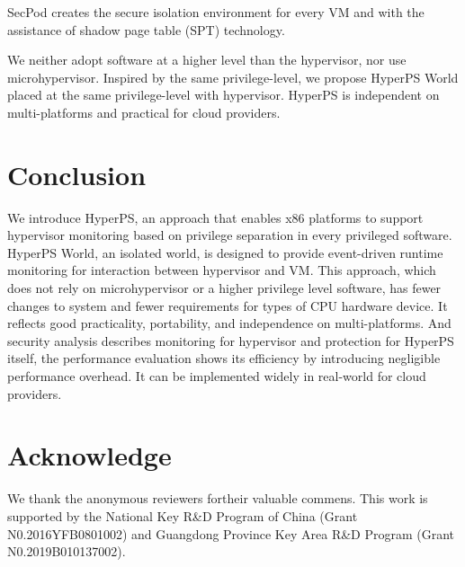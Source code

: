 \documentclass[conference]{IEEEtran}
\begin{document}
SecPod\cite{Wang2015SecPod} creates the secure isolation environment for every VM and with the assistance of shadow page table (SPT) technology.


We neither adopt software at a higher level than the hypervisor, nor use microhypervisor. Inspired by the same privilege-level, we propose HyperPS World placed at the same privilege-level with hypervisor. HyperPS is independent on multi-platforms and practical for cloud providers.

\section{Conclusion}\label{sec:conclusion}
We introduce HyperPS, an approach that enables x86 platforms to support hypervisor monitoring based on privilege separation in every privileged software. HyperPS World, an isolated world, is designed to provide event-driven runtime monitoring for interaction between hypervisor and VM. This approach, which does not rely on microhypervisor or a higher privilege level software, has fewer changes to system and fewer requirements for types of CPU hardware device. It reflects good practicality, portability, and independence on multi-platforms. And security analysis describes monitoring for hypervisor and protection for HyperPS itself, the performance evaluation shows its efficiency by introducing negligible performance overhead. It can be implemented widely in real-world for cloud providers.


\section{Acknowledge}
We thank the anonymous reviewers fortheir valuable commens. This work is supported by the National Key R\&D Program of China (Grant N0.2016YFB0801002) and Guangdong Province Key Area R\&D Program (Grant N0.2019B010137002).






 

\end{document}
